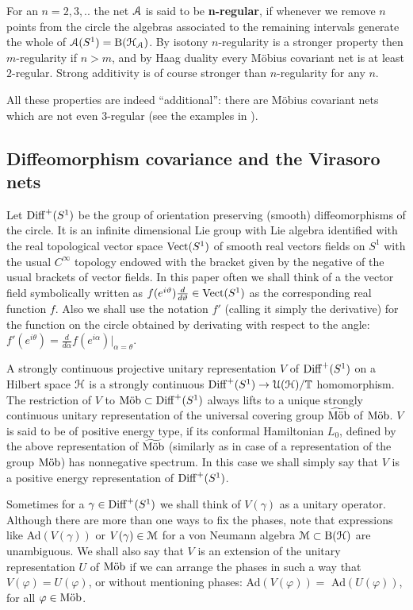 \documentclass[12pt]{article}
\begin{document}
For an $n=2,3,..$ the net ${\mathcal A}$ is said to be {\bf n-regular}, if 
whenever we remove $n$ points from the circle the algebras associated to
the remaining intervals generate the whole of ${\mathcal A}(S^1)={\rm B}({\mathcal H}_{\mathcal A})$. 
By isotony $n$-regularity is a stronger property then $m$-regularity
if $n>m$, and by Haag duality every M\"obius covariant net is at least 
$2$-regular. Strong additivity is of course stronger than 
$n$-regularity for any $n$. 

All these properties are indeed ``additional'': there
are M\"obius covariant nets which are not even $3$-regular (see the 
examples in \cite{GLW}).

\subsection{Diffeomorphism covariance and the Virasoro nets}
\label{subsec:diffcov}

Let ${{\rm Diff}^+(S^1)}$ be the group of orientation preserving (smooth) 
diffeomorphisms of the circle. It is an infinite dimensional Lie group
with Lie algebra
identified with the real topological vector space ${{\rm Vect}(S^1)}$ of smooth real
vectors fields on $S^1$ with the usual $C^\infty$ topology
\cite[Sect. 6]{Milnor} endowed with the bracket given by the negative of
the usual brackets of vector fields. In this paper often we shall think of
a the vector field symbolically written as
$f(e^{i\vartheta})\frac{d}{d\vartheta}\in {{\rm Vect}(S^1)}$ as the corresponding real
function $f$. Also we shall use the notation $f'$ (calling it simply the
derivative) for the function on the circle obtained by derivating with
respect to the angle:  
$f'(e^{i\theta})=\frac{d}{d\alpha}f(e^{i\alpha})|_{\alpha=\theta}$.

A strongly continuous projective unitary representation 
$V$ of ${{\rm Diff}^+(S^1)}$ on a Hilbert space ${\mathcal H}$ is a strongly 
continuous ${{\rm Diff}^+(S^1)} \rightarrow {\mathcal U}({\mathcal H})/\mathbb T$ homomorphism.
The restriction of $V$ to $\text {M\"{o}b} \subset {{\rm Diff}^+(S^1)}$ 
always lifts to a unique strongly continuous unitary
representation of the universal covering group 
$\widetilde{\text {M\"{o}b}}$ of $\text {M\"{o}b}$. $V$ is said to be of positive energy type,
if its conformal Hamiltonian $L_0$, defined by the above representation
of $\widetilde{\text {M\"{o}b}}$ (similarly as in case of a representation of the
group $\text {M\"{o}b}$) has nonnegative spectrum. 
In this case we shall simply say that $V$ is a positive energy 
representation of ${{\rm Diff}^+(S^1)}$. 


Sometimes for a $\gamma \in {{\rm Diff}^+(S^1)}$ we shall think of $V(\gamma)$ as a
unitary operator. Although there are more than one ways to fix the phases,
note that expressions like Ad$(V(\gamma))$ or $V(\gamma) \in {\mathcal M}$ for a von
Neumann algebra ${\mathcal M} \subset {\rm B}({\mathcal H})$ are unambiguous. We shall also say
that $V$ is an extension of the unitary representation $U$ of $\text {M\"{o}b}$ if we
can arrange the phases in such a way that $V(\varphi)=U(\varphi)$, or
without mentioning phases: Ad$(V(\varphi))=$ Ad$(U(\varphi))$, for all
$\varphi \in \text {M\"{o}b}$.
\end{document}
